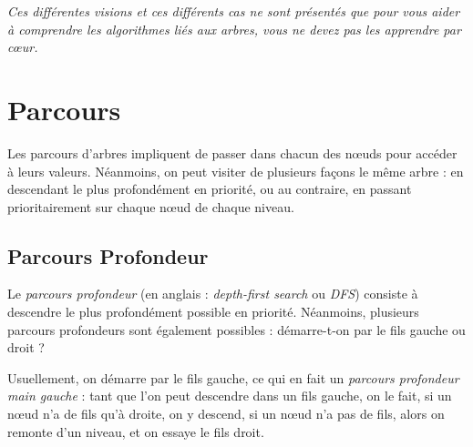 \documentclass[11pt,a4paper]{article}
\begin{document}

\bigskip

\textit{Ces différentes visions et ces différents cas ne sont présentés que pour vous aider à comprendre les algorithmes liés aux arbres, vous ne devez pas les apprendre par cœur.}


\clearpage

\section{Parcours}

\bigskip

Les parcours d'arbres impliquent de passer dans chacun des nœuds pour accéder à leurs valeurs.
Néanmoins, on peut visiter de plusieurs façons le même arbre : en descendant le plus profondément en priorité, ou au contraire, en passant prioritairement sur chaque nœud de chaque niveau.

\subsection{Parcours Profondeur}

Le \textit{parcours profondeur} (en anglais : \textit{depth-first search} ou \textit{DFS}) consiste à descendre le plus profondément possible en priorité.
Néanmoins, plusieurs parcours profondeurs sont également possibles : démarre-t-on par le fils gauche ou droit ?

Usuellement, on démarre par le fils gauche, ce qui en fait un \textit{parcours profondeur main gauche} : tant que l'on peut descendre dans un fils gauche, on le fait, si un nœud n'a de fils qu'à droite, on y descend, si un nœud n'a pas de fils, alors on remonte d'un niveau, et on essaye le fils droit.

\medskip

\vfillFirst
\end{document}
